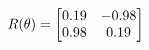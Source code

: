 \documentclass[preview]{standalone}
\begin{document}
\begin{align*}
\special{dvisvgm:raw <g id='unique000'>}R(\theta) = \begin{bmatrix}0.19 & -0.98\\0.98 & 0.19\end{bmatrix}\special{dvisvgm:raw </g>}
\end{align*}
\end{document}
